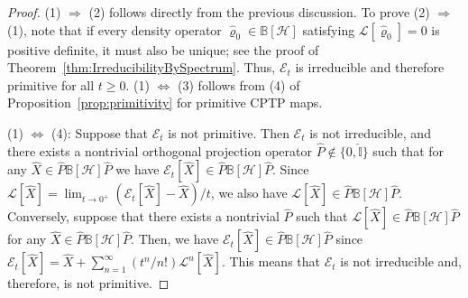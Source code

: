 \documentclass[preprint,pteplogo]{ptephy_v2}%
\numberwithin{equation}{section}
\theoremstyle{definition}
\newcommand{\mc}[1]{\mathcal{#1}}
\newcommand{\mbb}[1]{\mathbb{#1}}
\begin{document}
\begin{proof}
(1) $\Rightarrow$ (2) follows directly from the previous discussion.
To prove (2) $\Rightarrow$ (1), note that if every density operator $\hat{\varrho}_0 \in \mbb{B}[\mc{H}]$ satisfying $\mc{L}[\hat{\varrho}_0]=0$ is positive definite, it must also be unique; see the proof of Theorem~\ref{thm:IrreducibilityBySpectrum}.
Thus, $\mc{E}_t$ is irreducible and therefore primitive for all $t \geq 0$.
(1) $\Leftrightarrow$ (3) follows from (4) of Proposition~\ref{prop:primitivity} for primitive CPTP maps.

(1) $\Leftrightarrow$ (4): 
Suppose that $\mc{E}_t$ is not primitive. 
Then $\mc{E}_t$ is not irreducible, and there exists a nontrivial orthogonal projection operator $\hat{P} \notin \{ 0, \hat{\mbb{I}} \}$ such that for any $\hat{X} \in \hat{P} \mbb{B}[\mc{H}] \hat{P}$ we have $\mc{E}_t [\hat{X}] \in \hat{P} \mbb{B}[\mc{H}] \hat{P}$. 
Since $\mc{L}[\hat{X}] = \lim_{t \to 0^+} (\mc{E}_t[\hat{X}] -\hat{X})/t$, we also have $\mc{L}[\hat{X}] \in \hat{P} \mbb{B}[\mc{H}] \hat{P}$. 
Conversely, suppose that there exists a nontrivial $\hat{P}$ such that $\mc{L}[\hat{X}] \in \hat{P} \mbb{B}[\mc{H}] \hat{P}$ for any $\hat{X} \in \hat{P} \mbb{B}[\mc{H}] \hat{P}$. 
Then, we have $\mc{E}_t[\hat{X}] \in \hat{P} \mbb{B}[\mc{H}] \hat{P}$ since $\mc{E}_t[\hat{X}] = \hat{X} + \sum_{n=1}^\infty (t^n/n!) \mc{L}^n[\hat{X}]$.
This means that $\mc{E}_t$ is not irreducible and, therefore, is not primitive.


\end{proof}
\end{document}
